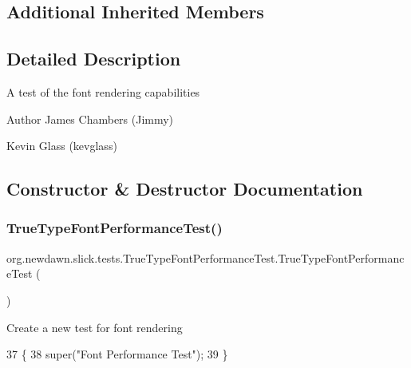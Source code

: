 \subsection*{Additional Inherited Members}


\subsection{Detailed Description}
A test of the font rendering capabilities

\begin{DoxyAuthor}{Author}
James Chambers (Jimmy) 

Kevin Glass (kevglass) 
\end{DoxyAuthor}


\subsection{Constructor \& Destructor Documentation}
\mbox{\label{classorg_1_1newdawn_1_1slick_1_1tests_1_1_true_type_font_performance_test_abad65130b826467e018e29fecca8ced3}} 
\subsubsection{\texorpdfstring{True\+Type\+Font\+Performance\+Test()}{TrueTypeFontPerformanceTest()}}
{\footnotesize\ttfamily org.\+newdawn.\+slick.\+tests.\+True\+Type\+Font\+Performance\+Test.\+True\+Type\+Font\+Performance\+Test (\begin{DoxyParamCaption}{ }\end{DoxyParamCaption})\hspace{0.3cm}{\ttfamily [inline]}}

Create a new test for font rendering 
\begin{DoxyCode}
37                                          \{
38         super(\textcolor{stringliteral}{"Font Performance Test"});
39     \}
\end{DoxyCode}


